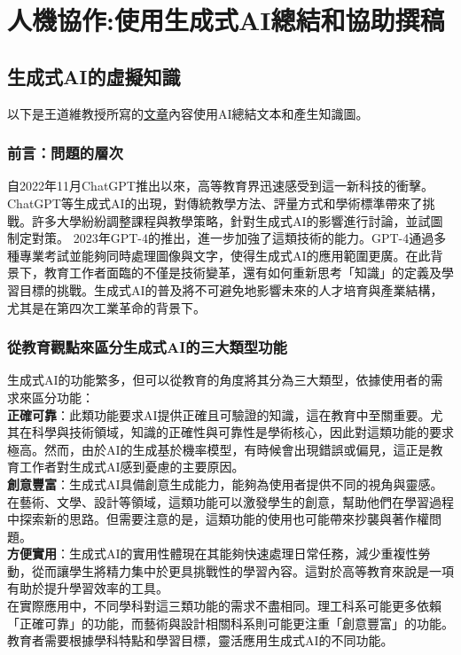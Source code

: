\chapter{人機協作:使用生成式AI總結和協助撰稿}

\section{生成式AI的虛擬知識}
以下是王道維教授所寫的\href{https://blog.udn.com/dawweiwang/178728006}{文章}內容使用AI總結文本和產生知識圖。
\subsection{前言：問題的層次}
自2022年11月ChatGPT推出以來，高等教育界迅速感受到這一新科技的衝擊。ChatGPT等生成式AI的出現，對傳統教學方法、評量方式和學術標準帶來了挑戰。許多大學紛紛調整課程與教學策略，針對生成式AI的影響進行討論，並試圖制定對策。
2023年GPT-4的推出，進一步加強了這類技術的能力。GPT-4通過多種專業考試並能夠同時處理圖像與文字，使得生成式AI的應用範圍更廣。在此背景下，教育工作者面臨的不僅是技術變革，還有如何重新思考「知識」的定義及學習目標的挑戰。生成式AI的普及將不可避免地影響未來的人才培育與產業結構，尤其是在第四次工業革命的背景下。
\subsection{從教育觀點來區分生成式AI的三大類型功能}
生成式AI的功能繁多，但可以從教育的角度將其分為三大類型，依據使用者的需求來區分功能：\\
\textbf{正確可靠}：此類功能要求AI提供正確且可驗證的知識，這在教育中至關重要。尤其在科學與技術領域，知識的正確性與可靠性是學術核心，因此對這類功能的要求極高。然而，由於AI的生成基於機率模型，有時候會出現錯誤或偏見，這正是教育工作者對生成式AI感到憂慮的主要原因。\\
\textbf{創意豐富}：生成式AI具備創意生成能力，能夠為使用者提供不同的視角與靈感。在藝術、文學、設計等領域，這類功能可以激發學生的創意，幫助他們在學習過程中探索新的思路。但需要注意的是，這類功能的使用也可能帶來抄襲與著作權問題。\\
\textbf{方便實用}：生成式AI的實用性體現在其能夠快速處理日常任務，減少重複性勞動，從而讓學生將精力集中於更具挑戰性的學習內容。這對於高等教育來說是一項有助於提升學習效率的工具。\\
\newpage
在實際應用中，不同學科對這三類功能的需求不盡相同。理工科系可能更多依賴「正確可靠」的功能，而藝術與設計相關科系則可能更注重「創意豐富」的功能。教育者需要根據學科特點和學習目標，靈活應用生成式AI的不同功能。

